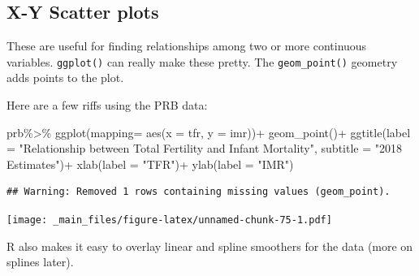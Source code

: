 \documentclass[
]{book}
\newenvironment{Shaded}{\begin{snugshade}}{\end{snugshade}}
\newcommand{\AttributeTok}[1]{\textcolor[rgb]{0.77,0.63,0.00}{#1}}
\newcommand{\FunctionTok}[1]{\textcolor[rgb]{0.00,0.00,0.00}{#1}}
\newcommand{\NormalTok}[1]{#1}
\newcommand{\SpecialCharTok}[1]{\textcolor[rgb]{0.00,0.00,0.00}{#1}}
\newcommand{\StringTok}[1]{\textcolor[rgb]{0.31,0.60,0.02}{#1}}
\begin{document}
\hypertarget{x-y-scatter-plots}{%
\subsection{X-Y Scatter plots}\label{x-y-scatter-plots}}

These are useful for finding relationships among two or more continuous
variables. \texttt{ggplot()} can really make these pretty. The \texttt{geom\_point()}
geometry adds points to the plot.

Here are a few riffs using the PRB data:

\begin{Shaded}
\begin{Highlighting}[]
\NormalTok{prb}\SpecialCharTok{\%\textgreater{}\%}
\FunctionTok{ggplot}\NormalTok{(}\AttributeTok{mapping=} \FunctionTok{aes}\NormalTok{(}\AttributeTok{x =}\NormalTok{ tfr,}
                    \AttributeTok{y =}\NormalTok{ imr))}\SpecialCharTok{+}
  \FunctionTok{geom\_point}\NormalTok{()}\SpecialCharTok{+}
  \FunctionTok{ggtitle}\NormalTok{(}\AttributeTok{label =} \StringTok{"Relationship between Total Fertility and Infant Mortality"}\NormalTok{,}
          \AttributeTok{subtitle =} \StringTok{"2018 Estimates"}\NormalTok{)}\SpecialCharTok{+}
  \FunctionTok{xlab}\NormalTok{(}\AttributeTok{label =} \StringTok{"TFR"}\NormalTok{)}\SpecialCharTok{+}
  \FunctionTok{ylab}\NormalTok{(}\AttributeTok{label =} \StringTok{"IMR"}\NormalTok{)}
\end{Highlighting}
\end{Shaded}

\begin{verbatim}
## Warning: Removed 1 rows containing missing values (geom_point).
\end{verbatim}

\texttt{[image: \_main\_files/figure-latex/unnamed-chunk-75-1.pdf]}

R also makes it easy to overlay linear and spline smoothers for the data
(more on splines later).
\end{document}
